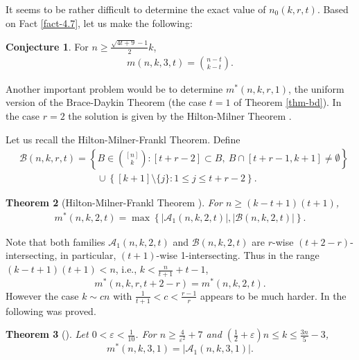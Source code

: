 \documentclass[11pt,a4paper]{article}
\newtheorem{thm}{Theorem}[section]
\newtheorem{false statement}{False statement}
\theoremstyle{definition}
\newtheorem{conj}[thm]{Conjecture}
\def\ha{\mathcal{A}}
\def\hb{\mathcal{B}}
\begin{document}
It seems to be rather difficult to determine the exact value of $n_0(k,r,t)$. Based on Fact \ref{fact-4.7}, let us make the following:

\begin{conj}
For $n\geq  \frac{\sqrt{4t+9}-1}{2}k$,
\begin{align*}
m(n,k,3,t) =\binom{n-t}{k-t}.
\end{align*}
\end{conj}

Another  important problem would be to determine $m^*(n,k,r,1)$, the uniform version of the Brace-Daykin Theorem (the case $t=1$ of Theorem \ref{thm-bd}). In the case $r=2$ the solution is given by the Hilton-Milner Theorem \cite{HM}.

Let us recall the Hilton-Milner-Frankl Theorem. Define
\begin{align*}
&\hb(n,k,r,t) =\left\{B\in \binom{[n]}{k}\colon [t+r-2]\subset B,\  B\cap [t+r-1,k+1]\neq \emptyset\right\}\\[2pt]
&\qquad\qquad\qquad\qquad\cup \left\{[k+1]\setminus \{j\}\colon 1\leq j\leq t+r-2\right\}.
\end{align*}


\begin{thm}[Hilton-Milner-Frankl Theorem \cite{HM,F78-2,AK0}]
For $n\geq (k-t+1)(t+1)$,
\begin{align}\label{ineq-hmfrankl}
m^*(n,k,2,t)=\max\left\{|\ha_1(n,k,2,t)|,|\hb(n,k,2,t)|\right\}.
\end{align}
\end{thm}

Note that both families $\ha_1(n,k,2,t)$ and $\hb(n,k,2,t)$ are $r$-wise $(t+2-r)$-intersecting, in particular, $(t+1)$-wise 1-intersecting. Thus in the range $(k-t+1)(t+1)<n$, i.e.,
$k<\frac{n}{t+1}+t-1$,
\[
m^*(n,k,r,t+2-r) =m^*(n,k,2,t).
\]
However the case $k\sim cn$ with $\frac{1}{t+1}<c<\frac{r-1}{r}$
 appears to be much harder. In \cite{FW} the following was proved.

\begin{thm}[\cite{FW}]
Let $0<\varepsilon<\frac{1}{10}$. For $n\geq \frac{4}{\varepsilon^2}+7$ and  $\left(\frac{1}{2}+\varepsilon \right)n\leq k\leq \frac{3n}{5}-3$,
\[
m^*(n,k,3,1) = |\ha_1(n,k,3,1)|.
\]
\end{thm}
\end{document}
